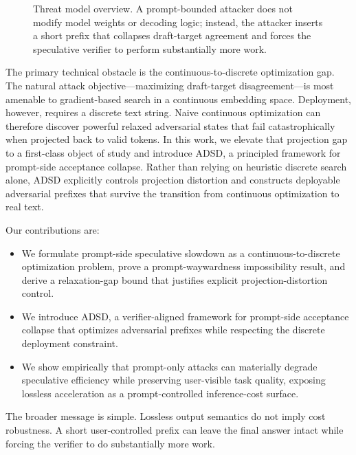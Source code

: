 \begin{figure}[t]
\centering
{}
\caption{Threat model overview. A prompt-bounded attacker does not modify model
weights or decoding logic; instead, the attacker inserts a short prefix that
collapses draft-target agreement and forces the speculative verifier to perform
substantially more work.}
\label{fig:threat-model}
\end{figure}

The primary technical obstacle is the continuous-to-discrete optimization gap.
The natural attack objective---maximizing draft-target disagreement---is most
amenable to gradient-based search in a continuous embedding space. Deployment,
however, requires a discrete text string. Naive continuous optimization can
therefore discover powerful relaxed adversarial states that fail
catastrophically when projected back to valid tokens. In this work, we elevate
that projection gap to a first-class object of study and introduce ADSD, a
principled framework for prompt-side acceptance collapse. Rather than relying
on heuristic discrete search alone, ADSD explicitly controls projection
distortion and constructs deployable adversarial prefixes that survive the
transition from continuous optimization to real text.

Our contributions are:
\begin{itemize}
\item We formulate prompt-side speculative slowdown as a
continuous-to-discrete optimization problem, prove a prompt-waywardness
impossibility result, and derive a relaxation-gap bound that justifies
explicit projection-distortion control.
\item We introduce ADSD, a verifier-aligned framework for prompt-side
acceptance collapse that optimizes adversarial prefixes while respecting the
discrete deployment constraint.
\item We show empirically that prompt-only attacks can materially degrade
speculative efficiency while preserving user-visible task quality, exposing
lossless acceleration as a prompt-controlled inference-cost surface.
\end{itemize}

The broader message is simple. Lossless output semantics do not imply cost
robustness. A short user-controlled prefix can leave the final answer intact
while forcing the verifier to do substantially more work.
